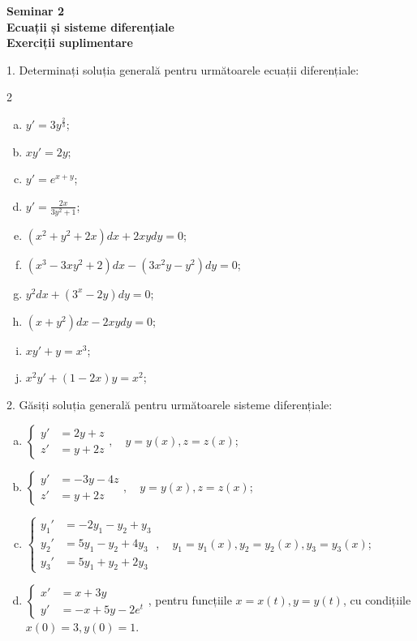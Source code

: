 \documentclass[11pt,a4paper]{article}
\theoremstyle{dotless}
\theoremstyle{dotlessdr}
\begin{document}

\begin{center}
  {\large\textbf{Seminar 2 \\
      Ecuații și sisteme diferențiale \\
      Exerciții suplimentare}}
\end{center}

\vspace{2cm}

1. Determinați soluția generală pentru următoarele ecuații diferențiale:
\begin{multicols}{2}
  \begin{enumerate}[(a)]
  \item $y' = 3y^{\frac{2}{3}}$;
  \item $xy' = 2y$;
  \item $y' = e^{x + y}$;
  \item $y' = \frac{2x}{3y^2 + 1}$;
  \item $(x^2 + y^2 + 2x) dx + 2xy dy = 0$;
  \item $(x^3 - 3xy^2 + 2)dx - (3x^2y - y^2) dy = 0$;
  \item $y^2 dx + (3^x - 2y) dy = 0$;
  \item $(x + y^2) dx - 2xy dy = 0$;
  \item $xy' + y = x^3$;
  \item $x^2 y' + (1 - 2x)y = x^2$;
  \end{enumerate}
\end{multicols}

\vspace{1cm}

2. Găsiți soluția generală pentru următoarele sisteme diferențiale:
\begin{enumerate}[(a)]
\item $\begin{cases}
    y' &= 2y + z \\
    z' &= y + 2z
  \end{cases}, \quad y = y(x), z = z(x)$;
\item $\begin{cases}
    y' &= -3y - 4z \\
    z' &= y + 2z
  \end{cases}, \quad y = y(x), z = z(x)$;
\item $\begin{cases}
    y_1' &= -2y_1 - y_2 + y_3 \\
    y_2' &= 5y_1 - y_2 + 4y_3 \\
    y_3' &= 5y_1 + y_2 + 2y_3
  \end{cases}, \quad y_1 = y_1(x), y_2 = y_2(x), y_3 = y_3(x)$;
\item $\begin{cases}
    x' &= x + 3y \\
    y' &= -x + 5y - 2e^t
  \end{cases}$, pentru funcțiile $x = x(t), y = y(t)$, cu condițiile $x(0) = 3, y(0) = 1$.
\end{enumerate}
\end{document}
